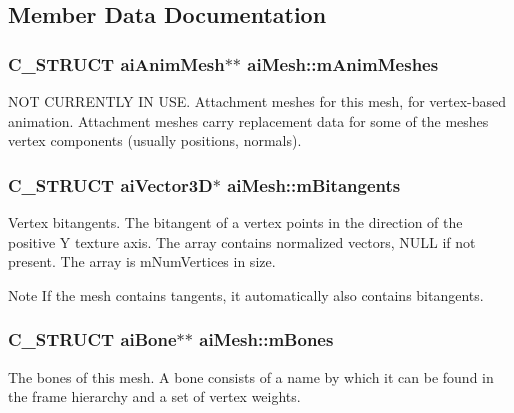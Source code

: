 \subsection{Member Data Documentation}
\subsubsection[{\texorpdfstring{m\+Anim\+Meshes}{mAnimMeshes}}]{\setlength{\rightskip}{0pt plus 5cm}C\+\_\+\+S\+T\+R\+U\+CT {\bf ai\+Anim\+Mesh}$\ast$$\ast$ ai\+Mesh\+::m\+Anim\+Meshes}\hypertarget{structai_mesh_a5078f7db7e99ed05db89dfa412f0e990}{}\label{structai_mesh_a5078f7db7e99ed05db89dfa412f0e990}
N\+OT C\+U\+R\+R\+E\+N\+T\+LY IN U\+SE. Attachment meshes for this mesh, for vertex-\/based animation. Attachment meshes carry replacement data for some of the mesh\textquotesingle{}es vertex components (usually positions, normals). 
\subsubsection[{\texorpdfstring{m\+Bitangents}{mBitangents}}]{\setlength{\rightskip}{0pt plus 5cm}C\+\_\+\+S\+T\+R\+U\+CT {\bf ai\+Vector3D}$\ast$ ai\+Mesh\+::m\+Bitangents}\hypertarget{structai_mesh_ab2a81bfe1731f01271ebab274a8f01c4}{}\label{structai_mesh_ab2a81bfe1731f01271ebab274a8f01c4}
Vertex bitangents. The bitangent of a vertex points in the direction of the positive Y texture axis. The array contains normalized vectors, N\+U\+LL if not present. The array is m\+Num\+Vertices in size. \begin{DoxyNote}{Note}
If the mesh contains tangents, it automatically also contains bitangents. 
\end{DoxyNote}
\subsubsection[{\texorpdfstring{m\+Bones}{mBones}}]{\setlength{\rightskip}{0pt plus 5cm}C\+\_\+\+S\+T\+R\+U\+CT {\bf ai\+Bone}$\ast$$\ast$ ai\+Mesh\+::m\+Bones}\hypertarget{structai_mesh_a0c0582a7f45b340b6a33552c53232539}{}\label{structai_mesh_a0c0582a7f45b340b6a33552c53232539}
The bones of this mesh. A bone consists of a name by which it can be found in the frame hierarchy and a set of vertex weights. 
